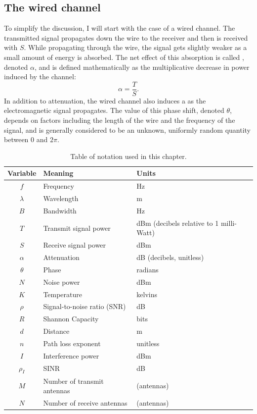 \subsection{The wired channel}
To simplify the discussion, I will start with the case of a wired channel. The transmitted signal propagates down the wire to the receiver and then is received with  $S$. While propagating through the wire, the signal gets slightly weaker as a small amount of energy is absorbed. The net effect of this absorption is called , denoted $\alpha$, and is defined mathematically as the multiplicative decrease in power induced by the channel:
\begin{equation}
	\label{eq:attenuation}
	\alpha = \frac{T}{S}.
\end{equation}
In addition to attenuation, the wired channel also induces a  as the electromagnetic signal propagates. The value of this phase shift, denoted $\theta$, depends on factors including the length of the wire and the frequency of the signal, and is generally considered to be an unknown, uniformly random quantity between $0$ and $2\pi$.

\begin{table}
\centering
\begin{tabular}{cll}
\toprule%
Variable & Meaning & Units\\
\midrule%
$f$ & Frequency & Hz \\
$\lambda$ & Wavelength & m \\
$B$ & Bandwidth & Hz \\
$T$ & Transmit signal power & dBm (decibels relative to 1 milli-Watt) \\
$S$ & Receive signal power & dBm \\
$\alpha$ & Attenuation & dB (decibels, unitless) \\
$\theta$ & Phase & radians \\
$N$ & Noise power & dBm \\
$K$ & Temperature & kelvins \\
$\rho$ & Signal-to-noise ratio (SNR) & dB \\
$R$ & Shannon Capacity & bits \\
$d$ & Distance & m \\
$n$ & Path loss exponent & unitless \\
$I$ & Interference power & dBm \\
$\rho_I$ & SINR & dB \\
$M$ & Number of transmit antennas & (antennas) \\
$N$ & Number of receive antennas & (antennas)\\
\bottomrule
\end{tabular}
\caption[Table of notation used in this chapter]{\label{tab:bg_notation}Table of notation used in this chapter.}
\end{table}

